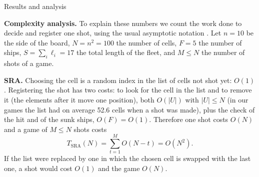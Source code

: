 \documentclass[letterpaper,11pt]{article} %
\renewcommand{\arraystretch}{1.8}
\begin{document}
\begin{Resultados}{Results and analysis}
\begin{table}[H]
    \centering
    \renewcommand{\arraystretch}{1.4}
    \resizebox{\linewidth}{!}{}
    \caption{CPU time of each agent per game (all its games pooled, in ms, timer with resolution of 1 ms) and per shot (in microseconds).}
    \label{tab:cpu}
\end{table}

\begin{center}
    \begin{minipage}{0.6\textwidth}
        \centering
        \label{fig:cpu}
    \end{minipage}
\end{center}

\textbf{Complexity analysis.} To explain these numbers we count the work done to decide and register one shot, using the usual asymptotic notation \cite{cormen2022}. Let $n=10$ be the side of the board, $N=n^2=100$ the number of cells, $F=5$ the number of ships, $S=\sum_i\ell_i=17$ the total length of the fleet, and $M\le N$ the number of shots of a game.

\textbf{SRA.} Choosing the cell is a random index in the list of cells not shot yet: $O(1)$. Registering the shot has two costs: to look for the cell in the list and to remove it (the elements after it move one position), both $O(|U|)$ with $|U|\le N$ (in our games the list had on average 52.6 cells when a shot was made), plus the check of the hit and of the sunk ships, $O(F)=O(1)$. Therefore one shot costs $O(N)$ and a game of $M\le N$ shots costs
\begin{equation}
    T_{\text{SRA}}(N)=\sum_{t=1}^{M}O(N-t)=O(N^2).
\end{equation}
If the list were replaced by one in which the chosen cell is swapped with the last one, a shot would cost $O(1)$ and the game $O(N)$.


\end{Resultados}
\end{document}
